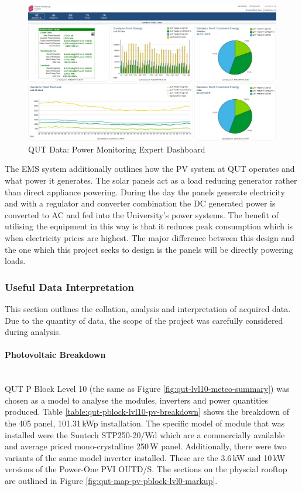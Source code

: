 \begin{figure}[H]
	\hfill\includegraphics[width = 150mm]{images/metering/pme/summary-dashboard}\hspace*{\fill}
	\caption{QUT Data: Power Monitoring Expert Dashboard} 
	\label{fig:qut-summary-dashboard}
\end{figure}

The EMS system additionally outlines how the PV system at QUT operates and what power it generates. The solar panels act as a load reducing generator rather than direct appliance powering. During the day the panels generate electricity and with a regulator and converter combination the DC generated power is converted to AC and fed into the University's power systems. The benefit of utilising the equipment in this way is that it reduces peak consumption which is when electricity prices are highest. The major difference between this design and the one which this project seeks to design is the panels will be directly powering loads.

\newpage

\subsubsection{Useful Data Interpretation}

This section outlines the collation, analysis and interpretation of acquired data. Due to the quantity of data, the scope of the project was carefully considered during analysis. 

\paragraph{Photovoltaic Breakdown}
~\\
QUT P Block Level 10 (the same as Figure \ref{fig:qut-lvl10-meteo-summary}) was chosen as a model to analyse the modules, inverters and power quantities produced. Table \ref{table:qut-pblock-lvl10-pv-breakdown} shows the breakdown of the 405 panel, 101.31\,kWp installation. The specific model of module that was installed were the Suntech STP250-20/Wd which are a commercially available and average priced mono-crystalline 250\,W panel. Additionally, there were two variants of the same model inverter installed. These are the 3.6\,kW and 10\,kW versions of the Power-One PVI OUTD/S. The sections on the physcial rooftop are outlined in Figure \ref{fig:qut-map-pv-pblock-lvl0-markup}.        

